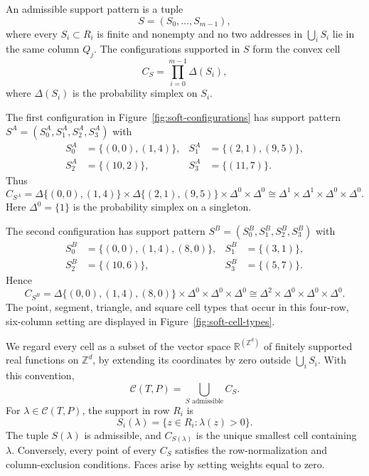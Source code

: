 \documentclass[11pt,reqno]{amsart}
\numberwithin{equation}{section}
\theoremstyle{definition}
\theoremstyle{remark}
\newcommand{\R}{\mathbb R}
\newcommand{\Z}{\mathbb Z}
\begin{document}
An admissible support pattern is a tuple
\[
 S=(S_0,\ldots,S_{m-1}),
\]
where every $S_i\subset R_i$ is finite and nonempty and no two addresses in
$\bigcup_iS_i$ lie in the same column $Q_j$.  The configurations supported
in $S$ form the convex cell
\begin{equation}\label{eq:soft-cell}
 C_S=\prod_{i=0}^{m-1}\Delta(S_i),
\end{equation}
where $\Delta(S_i)$ is the probability simplex on $S_i$.

The first configuration in Figure~\ref{fig:soft-configurations} has support
pattern $S^{A}=(S^{A}_0,S^{A}_1,S^{A}_2,S^{A}_3)$ with
\begin{equation}\label{eq:first-soft-support}
 \begin{aligned}
 S^{A}_0&=\{(0,0),(1,4)\},&
 S^{A}_1&=\{(2,1),(9,5)\},\\
 S^{A}_2&=\{(10,2)\},&
 S^{A}_3&=\{(11,7)\}.
 \end{aligned}
\end{equation}
Thus
\[
 C_{S^{A}}
 =\Delta\{(0,0),(1,4)\}
  \times\Delta\{(2,1),(9,5)\}
  \times\Delta^0\times\Delta^0
 \cong\Delta^1\times\Delta^1\times\Delta^0\times\Delta^0.
\]
Here $\Delta^0=\{1\}$ is the probability simplex on a singleton.

The second configuration has support pattern
$S^{B}=(S^{B}_0,S^{B}_1,S^{B}_2,S^{B}_3)$ with
\begin{equation}\label{eq:second-soft-support}
 \begin{aligned}
 S^{B}_0&=\{(0,0),(1,4),(8,0)\},&
 S^{B}_1&=\{(3,1)\},\\
 S^{B}_2&=\{(10,6)\},&
 S^{B}_3&=\{(5,7)\}.
 \end{aligned}
\end{equation}
Hence
\[
 C_{S^{B}}
 =\Delta\{(0,0),(1,4),(8,0)\}
  \times\Delta^0\times\Delta^0\times\Delta^0
 \cong\Delta^2\times\Delta^0\times\Delta^0\times\Delta^0.
\]
The point, segment, triangle, and square cell types that occur in this
four-row, six-column setting are displayed in
Figure~\ref{fig:soft-cell-types}.

We regard every cell as a subset of the vector space
$\R^{(\Z^d)}$ of finitely supported real functions on $\Z^d$, by extending
its coordinates by zero outside $\bigcup_iS_i$.  With this convention,
\begin{equation}\label{eq:group-soft-union}
 \mathcal C(T,P)=\bigcup_{S\text{ admissible}}C_S.
\end{equation}
For $\lambda\in\mathcal C(T,P)$, the support in row $R_i$ is
\[
 S_i(\lambda)=\{z\in R_i:\lambda(z)>0\}.
\]
The tuple $S(\lambda)$ is admissible, and $C_{S(\lambda)}$ is the unique
smallest cell containing $\lambda$.  Conversely, every point of every
$C_S$ satisfies the row-normalization and column-exclusion conditions.
Faces arise by setting weights equal to zero.
\end{document}
